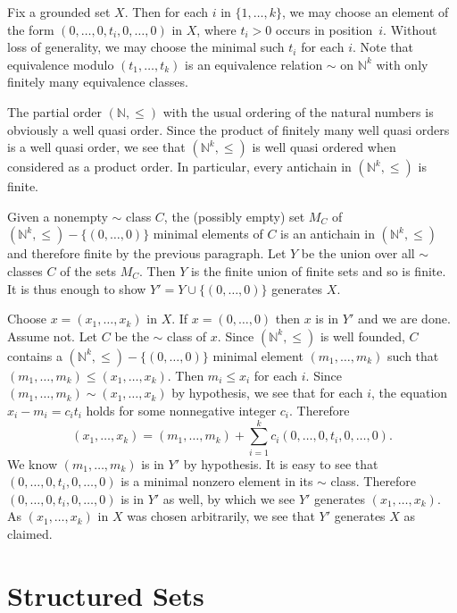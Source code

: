 \documentclass[review]{elsarticle}
\begin{document}
\begin{prf}
Fix a grounded set $X$. Then for each $i$ in $\{1,\ldots,k\}$,
we may choose an element of the form $(0,\ldots,0,t_i,0,\ldots,0)$
in $X$,
where $t_i>0$ occurs in position~$i$. Without loss of generality,
we may choose the minimal such $t_i$ for each $i$.
Note that equivalence
modulo $(t_1,\ldots,t_k)$ is an equivalence relation $\sim$ on $\mathbb{N}^k$
with only finitely many equivalence classes.

The partial order $(\mathbb{N},\le)$ with the usual ordering of the
natural numbers is obviously a well quasi order.
Since the
product of finitely many well quasi orders is a well quasi order,
we see that $(\mathbb{N}^k,\le)$ is well quasi ordered  when considered as
a product order. In particular, every antichain in $(\mathbb{N}^k,\le)$
is finite.

Given a nonempty $\sim$ class $C$, the (possibly empty) set $M_C$ of
$(\mathbb{N}^k,\le)-\{(0,\ldots,0)\}$
minimal elements of $C$ is an antichain in $(\mathbb{N}^k,\le)$
and therefore finite by
the previous paragraph. Let $Y$ be the union over all
$\sim$ classes $C$ of the sets $M_C$.
Then $Y$ is the finite union of finite sets
and so is finite. It is thus enough to show
$Y'=Y\cup\{(0,\ldots,0)\}$ generates $X$.

Choose $x=(x_1,\ldots,x_k)$ in $X$.
If $x=(0,\ldots,0)$ then $x$ is in $Y'$ and we are done. Assume not.
Let $C$ be the $\sim$ class of $x$.
Since $(\mathbb{N}^k,\le)$ is well founded, $C$ contains a
$(\mathbb{N}^k,\le)-\{(0,\ldots,0)\}$ minimal element
$(m_1,\ldots,m_k)$ such that $(m_1,\ldots,m_k)\le(x_1,\ldots,x_k)$.
Then $m_i\le x_i$ for each $i$. Since
$(m_1,\ldots,m_k)\sim (x_1,\ldots,x_k)$ by hypothesis, we see
that for each $i$, the equation $x_i-m_i=c_it_i$ holds
for some nonnegative integer $c_i$.
Therefore
$$(x_1,\ldots,x_k)=
(m_1,\ldots,m_k)+\sum_{i=1}^k c_i(0,\ldots,0,t_i,0,\ldots,0).$$
We know $(m_1,\ldots,m_k)$ is in $Y'$ by hypothesis. It is easy
to see that $(0,\ldots,0,t_i,0,\ldots,0)$ is a minimal nonzero
element in its $\sim$
class.
Therefore $(0,\ldots,0,t_i,0,\ldots,0)$ is
in $Y'$ as well, by which we see $Y'$ generates
$(x_1,\ldots,x_k)$. As $(x_1,\ldots,x_k)$ in $X$ was chosen arbitrarily,
we see that $Y'$ generates $X$ as claimed.
\end{prf}

\section{Structured Sets}
\end{document}
